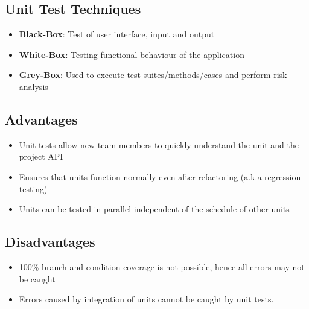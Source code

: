 \documentclass{article}
\begin{document}
\subsection{Unit Test Techniques}
\begin{itemize}
    \item \textbf{Black-Box}: Test of user interface, input and output
    
    \item \textbf{White-Box}: Testing functional behaviour of the application
    
    \item \textbf{Grey-Box}: Used to execute test suites/methods/cases and perform risk analysis
\end{itemize}

\subsection{Advantages}
\begin{itemize}
    \item Unit tests allow new team members to quickly understand the unit and the project API
    
    \item Ensures that units function normally even after refactoring (a.k.a regression testing)
    
    \item Units can be tested in parallel independent of the schedule of other units
\end{itemize}

\subsection{Disadvantages}
\begin{itemize}
    \item 100\% branch and condition coverage is not possible, hence all errors may not be caught
    
    \item Errors caused by integration of units cannot be caught by unit tests.
\end{itemize}
\end{document}

